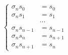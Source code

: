 \[
\left\{\begin{aligned}
\sigma_ns_0&=s_0\\
\sigma_ns_1&=s_1\\
&\cdots\\
\sigma_ns_{n-1}&=s_{n-1}\\
\sigma_ns_n&=s_{n+1}\\
\sigma_ns_{n+1}&=s_n
\end{aligned}\right.
\]
